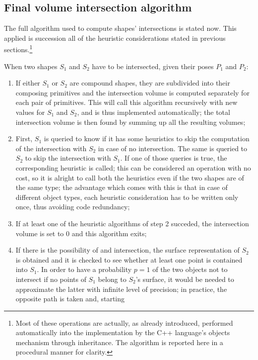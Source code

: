 \subsection{Final volume intersection algorithm}
The full algorithm used to compute shapes' intersections is stated
now. This applied is succession all of the heuristic considerations
stated in previous sections.\footnote{Most of these operations are
  actually, as already introduced, performed automatically into the
  implementation by the C++
  language's objects mechanism through inheritance. The algorithm is
  reported here in a procedural manner for clarity.}

When two shapes $S_1$ and $S_2$ have to be intersected, given their poses $P_1$ and $P_2$:
\begin{enumerate}
  \item{If either $S_1$ or $S_2$ are compound shapes, they are
    subdivided into their composing primitives and the intersection
    volume is computed separately for each pair of primitives. This
    will call this algorithm recursively with new values for $S_1$ and
    $S_2$, and is thus implemented automatically; the total
    intersection volume is then found by summing up all the resulting volumes;}
  \item{First, $S_1$ is queried to know if it has some heuristics to
    skip the computation of the intersection with $S_2$ in case of no
    intersection. The same is queried to $S_2$ to skip the
    intersection with $S_1$. If one of those queries is true, the
    corresponding heuristic is called; this can be considered an
    operation with no cost, so it is alright to call both the
    heuristics even if the two shapes are of the same type; the
    advantage which comes with this is that in case of different
    object types, each heuristic consideration has to be written only
    once, thus avoiding code redundancy;}
  \item{If at least one of the heuristic algorithms of step 2
    succeded, the intersection volume is set to $0$ and this algorithm
    exits;}
  \item{If there is the possibility of and intersection, the surface
    representation of $S_2$ is obtained and it is checked to see
    whether at least one point is contained into $S_1$. In order to
    have a probability $p=1$ of the two objects not to intersect if
    no points of $S_1$ belong to $S_2$'s surface, it
    would be needed to approximate the latter with infinite level of
    precision; in practice, the opposite path is taken and, starting
}
\end{enumerate}
